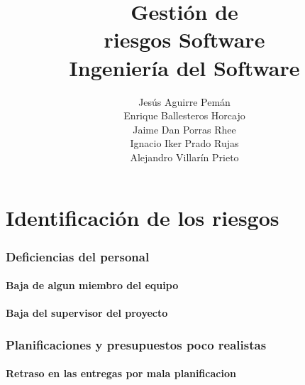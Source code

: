 \documentclass[spanish,a4paper,12pt]{report}	%
\begin{document}
\title{\textbf{\huge{Gestión de \\ 
	riesgos Software}} \\ \vspace{0.3cm}
	\Large{Ingeniería del Software}}
\author{ Jesús Aguirre Pemán \\
	 Enrique Ballesteros Horcajo \\
	 Jaime Dan Porras Rhee \\
	 Ignacio Iker Prado Rujas \\
	 Alejandro Villarín Prieto }
\date{\Today}
\maketitle

\newpage
\mbox{}
\thispagestyle{empty}						%
\newpage


\tableofcontents 							%

\newpage
\mbox{}
\thispagestyle{empty}						%
\newpage


\part{Identificación de los riesgos} %

\section{Deficiencias del personal}

	\subsection{Baja de algun miembro del equipo}

	\subsection {Baja del supervisor del proyecto}


\section{Planificaciones y presupuestos poco realistas}

	\subsection{Retraso en las entregas por mala planificacion}
\end{document}
